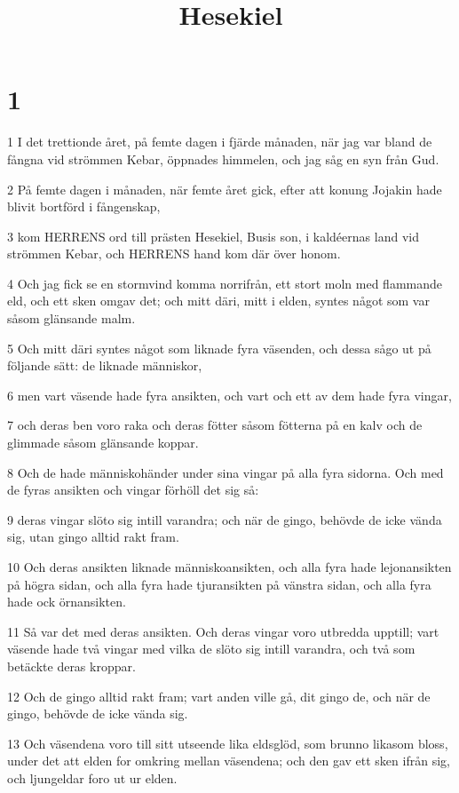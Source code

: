 

\title{Hesekiel}


\chapter{1}

\par 1 I det trettionde året, på femte dagen i fjärde månaden, när jag var bland de fångna vid strömmen Kebar, öppnades himmelen, och jag såg en syn från Gud.
\par 2 På femte dagen i månaden, när femte året gick, efter att konung Jojakin hade blivit bortförd i fångenskap,
\par 3 kom HERRENS ord till prästen Hesekiel, Busis son, i kaldéernas land vid strömmen Kebar, och HERRENS hand kom där över honom.
\par 4 Och jag fick se en stormvind komma norrifrån, ett stort moln med flammande eld, och ett sken omgav det; och mitt däri, mitt i elden, syntes något som var såsom glänsande malm.
\par 5 Och mitt däri syntes något som liknade fyra väsenden, och dessa sågo ut på följande sätt: de liknade människor,
\par 6 men vart väsende hade fyra ansikten, och vart och ett av dem hade fyra vingar,
\par 7 och deras ben voro raka och deras fötter såsom fötterna på en kalv och de glimmade såsom glänsande koppar.
\par 8 Och de hade människohänder under sina vingar på alla fyra sidorna. Och med de fyras ansikten och vingar förhöll det sig så:
\par 9 deras vingar slöto sig intill varandra; och när de gingo, behövde de icke vända sig, utan gingo alltid rakt fram.
\par 10 Och deras ansikten liknade människoansikten, och alla fyra hade lejonansikten på högra sidan, och alla fyra hade tjuransikten på vänstra sidan, och alla fyra hade ock örnansikten.
\par 11 Så var det med deras ansikten. Och deras vingar voro utbredda upptill; vart väsende hade två vingar med vilka de slöto sig intill varandra, och två som betäckte deras kroppar.
\par 12 Och de gingo alltid rakt fram; vart anden ville gå, dit gingo de, och när de gingo, behövde de icke vända sig.
\par 13 Och väsendena voro till sitt utseende lika eldsglöd, som brunno likasom bloss, under det att elden for omkring mellan väsendena; och den gav ett sken ifrån sig, och ljungeldar foro ut ur elden.
